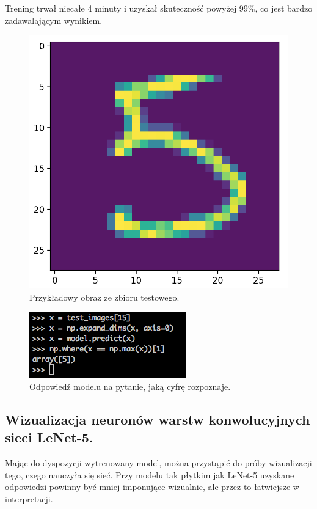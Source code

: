 Trening trwał niecałe 4 minuty i uzyskał skuteczność powyżej 99\%, co jest bardzo zadawalającym wynikiem.

\begin{figure}[ht]
\centerline{\includegraphics[scale=0.5]{resources/example_digit_lenet5.png}}
\caption{Przykładowy obraz ze zbioru testowego.}
\label{fig:lenet5-digit}
\end{figure}

\begin{figure}[ht]
\centerline{\includegraphics[scale=0.5]{resources/example_digit_lenet5_response.png}}
\caption{Odpowiedź modelu na pytanie, jaką cyfrę rozpoznaje.}
\label{fig:lenet5-response}
\end{figure}

\subsection{Wizualizacja neuronów warstw konwolucyjnych sieci LeNet-5.}
Mając do dyspozycji wytrenowany model, można przystąpić do próby wizualizacji tego, czego nauczyła się sieć. Przy modelu tak płytkim jak LeNet-5 uzyskane odpowiedzi powinny być mniej imponujące wizualnie, ale przez to łatwiejsze w interpretacji.

